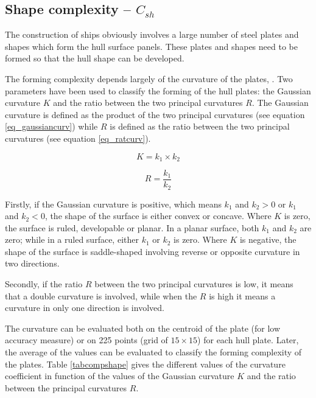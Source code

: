 \subsection{Shape complexity -- $C_{sh}$}
The construction of ships obviously involves a large number of steel plates and shapes which form the hull surface panels. These plates and shapes need to be formed so that the hull shape can be developed.


The forming complexity depends largely of the curvature of the plates, \cite{parsons1999scalar}. Two parameters have been used to classify the forming of the hull plates: the Gaussian curvature $K$ and the ratio between the two principal curvatures $R$. The Gaussian curvature is defined as the product of the two principal curvatures (see equation \ref{eq_gaussiancurv}) while $R$ is defined as the ratio between the two principal curvatures (see equation \ref{eq_ratcurv}).
	
\begin{equation}
\label{eq_gaussiancurv}
K = k_1 \times k_2
\end{equation}
	
\begin{equation}
\label{eq_ratcurv}
R = \frac{k_1}{k_2}
\end{equation}
	
Firstly, if the Gaussian curvature is positive, which means $k_1$ and $k_2 > 0$ or $k_1$ and $k_2 < 0$, the shape of the surface is either convex or concave. Where $K$ is zero, the surface is ruled, developable or planar. In a planar surface, both $k_1$ and $k_2$ are zero; while in a ruled surface, either $k_1$ or $k_2$ is zero. Where $K$ is negative, the shape of the surface is saddle-shaped involving reverse or opposite curvature in two directions.


Secondly, if the ratio $R$ between the two principal curvatures is low, it means that a double curvature is involved, while when the $R$ is high it means a curvature in only one direction is involved.


The curvature can be evaluated both on the centroid of the plate (for low accuracy measure) or on 225 points (grid of $15 \times 15$) for each hull plate. Later, the average of the values can be evaluated to classify the forming complexity of the plates. Table \ref{tabcompshape} gives the different values of the curvature coefficient in function of the values of the Gaussian curvature $K$ and the ratio between the principal curvatures $R$.


